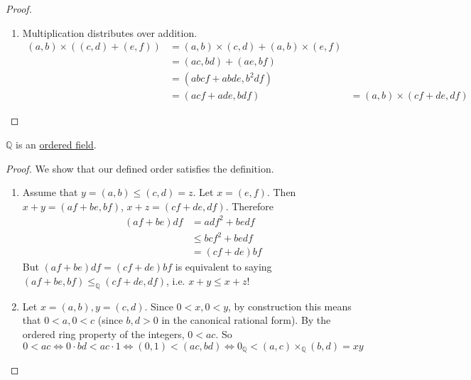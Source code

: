 \begin{proof}
\begin{enumerate}
      \begin{align}
        (a, b) \times ((c, d) \times (e, f)) & = (a, b) \times (ce, df) \\ 
                                             & = (ace, bdf) \\
                                             & = (ac, bd) \times (e, f) \\
                                             & = ((a, b) \times (c, d)) \times (e, f)
      \end{align}
      \item Multiplication distributes over addition. 
        \begin{align}
          (a, b) \times ((c, d) + (e, f)) & = (a, b) \times (c, d) + (a, b) \times (e, f) \\
                                          & = (ac, bd) + (ae, bf) \\
                                          & = (abcf + abde, b^2 df) \\
                                          & = (acf + ade, bdf)  
                                          & = (a, b) \times (cf + de, df)
        \end{align}
    \end{enumerate}
  \end{proof} 

  \begin{theorem}
    \label{thm:rationals-are-an-ordered-field}
    $\mathbb{Q}$ is an \hyperref[alg-def:ordered-field]{ordered field}. 
  \end{theorem}
  \begin{proof}
    We show that our defined order satisfies the definition. 
    \begin{enumerate}
      \item Assume that $y = (a, b) \leq (c, d) = z$. Let $x = (e, f)$. Then $x + y = (af + be, bf)$, $x + z = (cf + de, df)$. Therefore 
      \begin{align}
        (af + be) df & = adf^2 + bedf \\ 
                     & \leq bcf^2 + bedf \\
                     & = (cf + de) bf
      \end{align} 
      But $(af + be) df = (cf + de) bf$ is equivalent to saying $(af + be, bf) \leq_{\mathbb{Q}} (cf + de, df)$, i.e. $x + y \leq x + z$!  

      \item Let $x = (a, b), y = (c, d)$. Since $0 < x, 0 < y$, by construction this means that $0 < a, 0 < c$ (since $b, d > 0$ in the canonical rational form). By the ordered ring property of the integers, $0 < ac$. So 
      \begin{equation}
        0 < ac \iff 0 \cdot bd < ac \cdot 1 \iff (0, 1) < (ac, bd)  \iff 0_{\mathbb{Q}} < (a, c) \times_{\mathbb{Q}} (b, d) = x y
      \end{equation}
    \end{enumerate}
  \end{proof}

